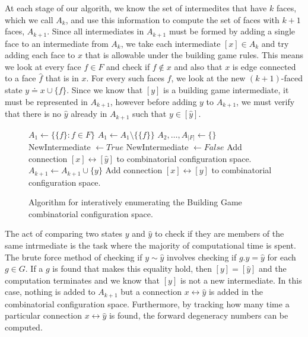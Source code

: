 At each stage of our algorith, we know the set of intermedites that have $k$ faces, which we call $A_k$, and use this information to compute the set of faces with $k+1$ faces, $A_{k+1}$. Since all intermediates in $A_{k+1}$ must be formed by adding a single face to an intermediate from $A_k$, we take each intermediate $[x] \in A_k$ and try adding each face to $x$ that is allowable under the building game rules. This means we look at every face $f \in F$ and check if $f \not\in x$ and also that $x$ is edge connected to a face $\hat{f}$ that is in $x$. For every such faces $f$, we look at the new $(k+1)$-faced state $y \doteq x\cup \{f\}$. Since we know that $[y]$ is a building game intermediate, it must be represented in $A_{k+1}$, however before adding $y$ to $A_{k+1}$, we must verify that there is no $\hat{y}$ already in $A_{k+1}$ such that $y \in [\hat{y}]$.

\begin{figure}[ht]
\centering
\begin{algorithmic}
  \State $A_1\gets \{\{f\} : f \in F\}$ 
  \State $A_1 \gets A_1 \setminus \{\{f\}\}$
  \EndIf
  \EndFor
  \State $A_2, \dots, A_{|F|} \gets \{\}$ 
  \State NewIntermediate $\gets True$
  \State NewIntermediate $\gets False$
  \State Add connection $[x] \leftrightarrow [\hat{y}]$ to combinatorial configuration space.
  \EndIf
  \EndFor
  \State $A_{k+1} \gets A_{k+1} \cup \{y\}$
  \State Add connection $[x] \leftrightarrow [y]$ to combinatorial configuration space.
  \EndIf
  \EndFor
  \EndFor
  \EndFor
\end{algorithmic}
\caption{Algorithm for interatively enumerating the Building Game combinatorial configuration space.}
\label{alg:CCS}
\end{figure}

The act of comparing two states $y$ and $\hat{y}$ to check if they are members of the same intrmediate is the task where the majority of computational time is spent. The brute force method of checking if $y \sim \hat{y}$ involves checking if $g.y = \hat{y}$ for each $g \in G$. If a $g$ is found that makes this equality hold, then $[y] = [ \hat{y}]$ and the computation terminates and we know that $[y]$ is not a new intermediate. In this case, nothing is added to $A_{k+1}$ but a connection $x \leftrightarrow \hat{y}$ is added in the combinatorial configuration space. Furthermore, by tracking how many time a particular connection $x \leftrightarrow \hat{y}$ is found, the forward degeneracy numbers can be computed. 


